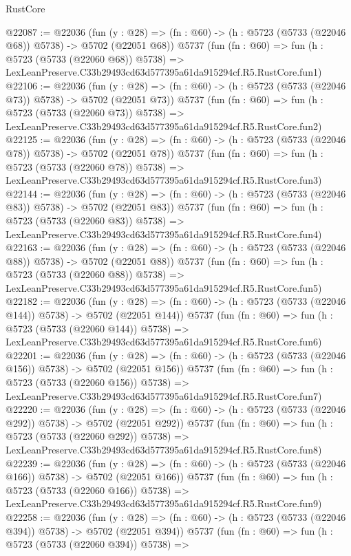 \begin{lexlean}{RustCore}
\begin{coremodule}
@22087 := @22036
    (fun (y : @28) => (fn : @60) -> (h : @5723 (@5733 (@22046 @68)) @5738) -> @5702 (@22051 @68))
    @5737
    (fun (fn : @60) =>
    fun (h : @5723 (@5733 (@22060 @68)) @5738) =>
    LexLeanPreserve.C33b29493cd63d577395a61da915294cf.R5.RustCore.fun1)
@22106 := @22036
    (fun (y : @28) => (fn : @60) -> (h : @5723 (@5733 (@22046 @73)) @5738) -> @5702 (@22051 @73))
    @5737
    (fun (fn : @60) =>
    fun (h : @5723 (@5733 (@22060 @73)) @5738) =>
    LexLeanPreserve.C33b29493cd63d577395a61da915294cf.R5.RustCore.fun2)
@22125 := @22036
    (fun (y : @28) => (fn : @60) -> (h : @5723 (@5733 (@22046 @78)) @5738) -> @5702 (@22051 @78))
    @5737
    (fun (fn : @60) =>
    fun (h : @5723 (@5733 (@22060 @78)) @5738) =>
    LexLeanPreserve.C33b29493cd63d577395a61da915294cf.R5.RustCore.fun3)
@22144 := @22036
    (fun (y : @28) => (fn : @60) -> (h : @5723 (@5733 (@22046 @83)) @5738) -> @5702 (@22051 @83))
    @5737
    (fun (fn : @60) =>
    fun (h : @5723 (@5733 (@22060 @83)) @5738) =>
    LexLeanPreserve.C33b29493cd63d577395a61da915294cf.R5.RustCore.fun4)
@22163 := @22036
    (fun (y : @28) => (fn : @60) -> (h : @5723 (@5733 (@22046 @88)) @5738) -> @5702 (@22051 @88))
    @5737
    (fun (fn : @60) =>
    fun (h : @5723 (@5733 (@22060 @88)) @5738) =>
    LexLeanPreserve.C33b29493cd63d577395a61da915294cf.R5.RustCore.fun5)
@22182 := @22036
    (fun (y : @28) => (fn : @60) -> (h : @5723 (@5733 (@22046 @144)) @5738) -> @5702 (@22051 @144))
    @5737
    (fun (fn : @60) =>
    fun (h : @5723 (@5733 (@22060 @144)) @5738) =>
    LexLeanPreserve.C33b29493cd63d577395a61da915294cf.R5.RustCore.fun6)
@22201 := @22036
    (fun (y : @28) => (fn : @60) -> (h : @5723 (@5733 (@22046 @156)) @5738) -> @5702 (@22051 @156))
    @5737
    (fun (fn : @60) =>
    fun (h : @5723 (@5733 (@22060 @156)) @5738) =>
    LexLeanPreserve.C33b29493cd63d577395a61da915294cf.R5.RustCore.fun7)
@22220 := @22036
    (fun (y : @28) => (fn : @60) -> (h : @5723 (@5733 (@22046 @292)) @5738) -> @5702 (@22051 @292))
    @5737
    (fun (fn : @60) =>
    fun (h : @5723 (@5733 (@22060 @292)) @5738) =>
    LexLeanPreserve.C33b29493cd63d577395a61da915294cf.R5.RustCore.fun8)
@22239 := @22036
    (fun (y : @28) => (fn : @60) -> (h : @5723 (@5733 (@22046 @166)) @5738) -> @5702 (@22051 @166))
    @5737
    (fun (fn : @60) =>
    fun (h : @5723 (@5733 (@22060 @166)) @5738) =>
    LexLeanPreserve.C33b29493cd63d577395a61da915294cf.R5.RustCore.fun9)
@22258 := @22036
    (fun (y : @28) => (fn : @60) -> (h : @5723 (@5733 (@22046 @394)) @5738) -> @5702 (@22051 @394))
    @5737
    (fun (fn : @60) =>
    fun (h : @5723 (@5733 (@22060 @394)) @5738) =>

\end{coremodule}
\end{lexlean}
